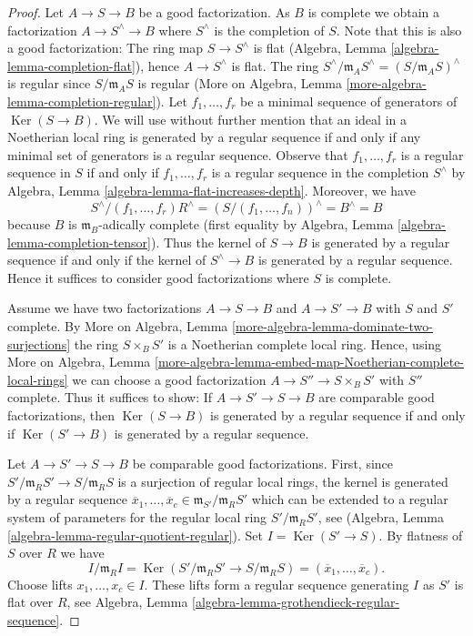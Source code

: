 \documentclass{stacks-project}
\theoremstyle{plain}
\theoremstyle{definition}
\theoremstyle{remark}
\numberwithin{equation}{subsection}
\def\Ker{\mathop{\mathrm{Ker}}}
\begin{document}
\begin{proof}
Let $A \to S \to B$ be a good factorization.
As $B$ is complete we obtain a factorization
$A \to S^\wedge \to B$ where $S^\wedge$ is the completion of $S$.
Note that this is also a good factorization:
The ring map $S \to S^\wedge$ is flat
(Algebra, Lemma \ref{algebra-lemma-completion-flat}),
hence $A \to S^\wedge$ is flat.
The ring $S^\wedge/\mathfrak m_A S^\wedge = (S/\mathfrak m_A S)^\wedge$
is regular since $S/\mathfrak m_A S$ is regular
(More on Algebra, Lemma \ref{more-algebra-lemma-completion-regular}).
Let $f_1, \ldots, f_r$ be a minimal sequence of generators
of $\Ker(S \to B)$. We will use without further mention
that an ideal in a Noetherian local ring is generated by a regular
sequence if and only if any minimal set of generators is a
regular sequence. Observe that $f_1, \ldots, f_r$
is a regular sequence in $S$ if and only if $f_1, \ldots, f_r$
is a regular sequence in the completion $S^\wedge$ by
Algebra, Lemma \ref{algebra-lemma-flat-increases-depth}.
Moreover, we have
$$
S^\wedge/(f_1, \ldots, f_r)R^\wedge =
(S/(f_1, \ldots, f_n))^\wedge = B^\wedge = B
$$
because $B$ is $\mathfrak m_B$-adically complete (first equality by
Algebra, Lemma \ref{algebra-lemma-completion-tensor}).
Thus the kernel of $S \to B$ is generated by a regular sequence
if and only if the kernel of $S^\wedge \to B$ is generated by a
regular sequence.
Hence it suffices to consider good factorizations where $S$ is complete.

\medskip\noindent
Assume we have two factorizations $A \to S \to B$ and
$A \to S' \to B$ with $S$ and $S'$ complete. By
More on Algebra, Lemma \ref{more-algebra-lemma-dominate-two-surjections}
the ring $S \times_B S'$ is a Noetherian complete local ring.
Hence, using More on Algebra, Lemma
\ref{more-algebra-lemma-embed-map-Noetherian-complete-local-rings}
we can choose a good factorization $A \to S'' \to S \times_B S'$
with $S''$ complete. Thus it suffices to show:
If $A \to S' \to S \to B$ are comparable good factorizations,
then $\Ker(S \to B)$ is generated by a regular sequence
if and only if $\Ker(S' \to B)$ is generated by a regular sequence.

\medskip\noindent
Let $A \to S' \to S \to B$ be comparable good factorizations.
First, since $S'/\mathfrak m_R S' \to S/\mathfrak m_R S$ is
a surjection of regular local rings, the kernel is generated
by a regular sequence
$\overline{x}_1, \ldots, \overline{x}_c \in
\mathfrak m_{S'}/\mathfrak m_R S'$
which can be extended to a regular system of parameters for
the regular local ring $S'/\mathfrak m_R S'$, see
(Algebra, Lemma \ref{algebra-lemma-regular-quotient-regular}).
Set $I = \Ker(S' \to S)$. By flatness of $S$ over $R$ we have
$$
I/\mathfrak m_R I =
\Ker(S'/\mathfrak m_R S' \to S/\mathfrak m_R S) =
(\overline{x}_1, \ldots, \overline{x}_c).
$$
Choose lifts $x_1, \ldots, x_c \in I$. These lifts form a regular sequence
generating $I$ as $S'$ is flat over $R$, see
Algebra, Lemma \ref{algebra-lemma-grothendieck-regular-sequence}.


\end{proof}
\end{document}
